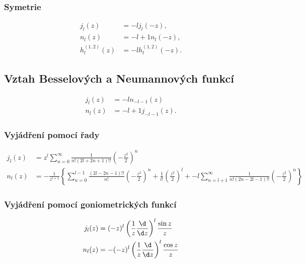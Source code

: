 \subsubsection*{Symetrie}
    \begin{subequations}
        \begin{align}
            j_{l}(z)&=\minus{l}j_{l}(-z),\\
            n_{l}(z)&=\minus{l+1}n_{l}(-z),\\
            h_{l}^{(1,2)}(z)&=\minus{l}h_{l}^{(1,2)}(-z).
        \end{align}				
    \end{subequations}

\subsection*{Vztah Besselových a Neumannových funkcí}
    \begin{subequations}
        \begin{align}
            j_{l}(z)&=\minus{l}n_{-l-1}(z)\\
            n_{l}(z)&=\minus{l+1}j_{-l-1}(z).
        \end{align}
        \label{eq:BesselNeumann}
    \end{subequations}

\subsubsection*{Vyjádření pomocí řady}
    \begin{subequations}
        \begin{align}
            j_{l}(z)
                &=z^{l}\sum_{n=0}^{\infty}\frac{1}{n!\left(2l+2n+1\right)!!}\left(-\frac{z^{2}}{2}\right)^{n}\\
            n_{l}(z)
                &=-\frac{1}{z^{l+1}}\left\{
                    \sum_{n=0}^{l-1}\frac{\left(2l-2n-1\right)!!}{n!}\left(-\frac{z^{2}}{2}\right)^{n}
                    +\frac{1}{l!}\left(\frac{z^{2}}{2}\right)^{l}
                    +\minus{l}\sum_{n=l+1}^{\infty}\frac{1}{n!\left(2n-2l-1\right)!!}\left(-\frac{z^{2}}{2}\right)^{n}
                    \right\}
        \end{align}        
    \end{subequations}

\subsubsection*{Vyjádření pomocí goniometrických funkcí}
    \begin{subequations}
        \begin{align}
            j_{l}(z)
                &=(-z)^{l}\left(\frac{1}{z}\frac{\d}{\d z}\right)^{l}\frac{\sin{z}}{z}\\					
            n_{l}(z)
                &=-(-z)^{l}\left(\frac{1}{z}\frac{\d}{\d z}\right)^{l}\frac{\cos{z}}{z}
        \end{align}        
    \end{subequations}

